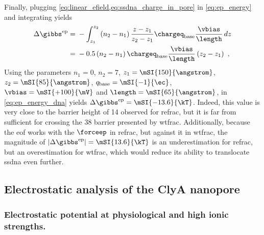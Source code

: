Finally, plugging \cref{eq:linear_efield,eq:ssdna_charge_in_pore} in \cref{eq:ep_energy} and integrating
yields
%
\begin{align}\label{eq:ep_energy_dna}
  \Delta \gibbs^{\textrm{ep}} %
     ={}& - \int_{z_1}^{z_2} %
          \left(  n_2 - n_1 \right) %
          \dfrac{ z - z_1 }{z_2 - z_1}
          \chargeq_{\textrm{base}} \dfrac{\vbias}{\length} \,dz \nonumber \\
     ={}& - 0.5 \left(  n_2 - n_1 \right)  \chargeq_{\textrm{base}}
            \dfrac{\vbias}{\length} \left(  z_2 - z_1 \right)
  \text{ ,}
\end{align}
%
Using the parameters $n_1 = 0$, $n_2 = 7$, $z_1 = \mSI{150}{\angstrom}$, $z_2 = \mSI{85}{\angstrom}$,
$q_{\textrm{base}} = \mSI{-1}{\ec}$, $\vbias = \mSI{+100}{\mV}$ and $\length = \mSI{65}{\angstrom}$, in
\cref{eq:ep_energy_dna} yields $\Delta \gibbs^{\textrm{ep}} = \mSI{-13.6}{\kT}$. Indeed, this value is very
close to the barrier height of \SI{14}{\kT} observed for \gls{refrac}, but it is far from sufficient for
crossing the \SI{38}{\kT} barrier presented by \gls{wtfrac}. Additionally, because the \gls{eof} works with
the $\forceep$ in \gls{refrac}, but against it in \gls{wtfrac}, the magnitude of $ \left| \Delta
\gibbs^{\textrm{ep}} \right| = \mSI{13.6}{\kT}$ is an underestimation for \gls{refrac}, but an overestimation
for \gls{wtfrac}, which would reduce its ability to translocate \gls{ssdna} even further.


%
%
\subsection{Electrostatic analysis of the ClyA nanopore}
%
\label{sec:elec:clya}
%

\subsubsection{Electrostatic potential at physiological and high ionic strengths.}
%

